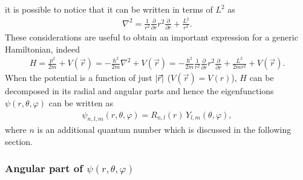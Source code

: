 it is possible to notice that it can be written in terms of $L^2$ as
\begin{align*}
    \nabla^2 =  \frac{1}{r^2} \frac{\partial}{\partial r}  r^2 \frac{\partial}{\partial r}+ \frac{L^2}{r^2}. 
\end{align*}
These considerations are useful to obtain an important expression for a generic Hamiltonian, indeed
\begin{align}
    H = \frac{p^2}{2m}+V(\Vec{r}) = -\frac{\hbar^2}{2m} \nabla^2 + V(\Vec{r}) = -\frac{\hbar^2}{2m}\frac{1}{r^2}\frac{\partial}{\partial r} r^2 \frac{\partial}{\partial r} + \frac{L^2}{2m r^2} + V(\vec{r}).
    \label{eq:Hatoms3}
\end{align}
When the potential is a function of just $\abs{\vec{r}}$ ($V(\vec{r}) = V(r)$), $H$ can be decomposed in its radial and angular parts and hence the eigenfunctions $\psi(r,\theta,\varphi)$ can be written as 
\begin{align}
    \psi_{n,l,m}(r,\theta,\varphi) = R_{n,l}(r) \, Y_{l,m}(\theta,\varphi),
    \label{eq:psi_compl}
\end{align}
where $n$ is an additional quantum number which is discussed in the following section. 

\subsubsection{Angular part of $\psi(r,\theta,\varphi)$}

